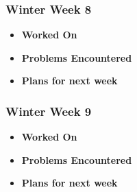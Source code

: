 \documentclass[compsoc,draftclsnofoot,onecolumn,10pt]{IEEEtran}
\begin{document}
\subsubsection{Winter Week 8}
\begin{itemize}
    \item {\textbf{Worked On}}
    \begin{itemize}
        
    \end{itemize}

    \item {\textbf{Problems Encountered}}
    \begin{itemize}
        
    \end{itemize}

    \item{\textbf{Plans for next week}}
    \begin{itemize}
        
    \end{itemize}

\end{itemize}

\subsubsection{Winter Week 9}
\begin{itemize}
    \item {\textbf{Worked On}}
    \begin{itemize}
        
    \end{itemize}

    \item {\textbf{Problems Encountered}}
    \begin{itemize}
        
    \end{itemize}

    \item{\textbf{Plans for next week}}
    \begin{itemize}
        
    \end{itemize}

\end{itemize}
\end{document}
